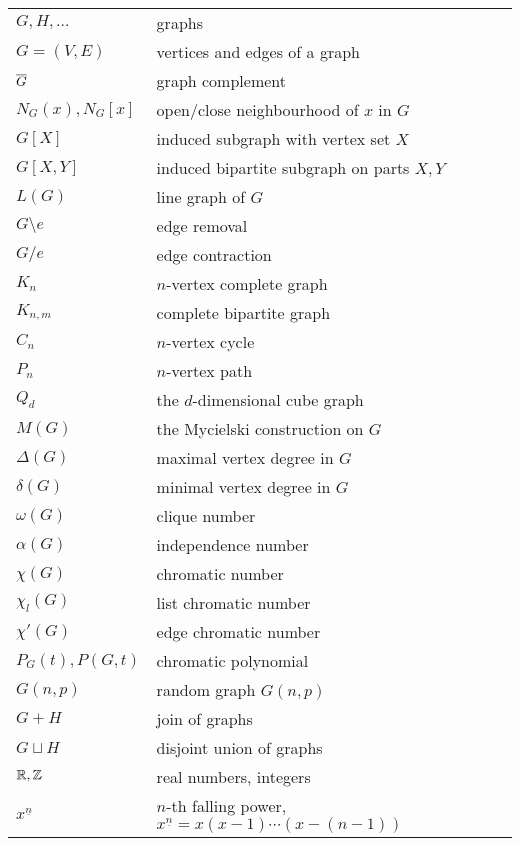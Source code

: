 \begin{center}
\begin{tabular}{ll}
$G, H, \ldots$          	&  graphs \\
$G=(V,E)$					&  vertices and edges of a graph \\
$\overline{G}$					&  graph complement \\
$N_G(x), N_G[x]$			&  open/close neighbourhood of $x$ in $G$ \\
$G[X]$						&  induced subgraph with vertex set $X$ \\
$G[X,Y]$					&  induced bipartite subgraph on parts $X,Y$ \\
$L(G)$						&  line graph of $G$ \\
$G\setminus e$				&  edge removal \\
$G/e$						&  edge contraction \\
$K_n$						&  $n$-vertex complete graph \\
$K_{n,m}$					&  complete bipartite graph \\
$C_n$						&  $n$-vertex cycle \\
$P_n$						&  $n$-vertex path \\
$Q_d$						&  the $d$-dimensional cube graph \\
$M(G)$						&  the Mycielski construction on $G$ \\
$\Delta(G)$					&  maximal vertex degree in $G$ \\
$\delta(G)$					&  minimal vertex degree in $G$ \\
$\omega(G)$					&  clique number \\
$\alpha(G)$					&  independence number \\
$\chi(G)$					&  chromatic number \\
$\chi_l(G)$					&  list chromatic number \\
$\chi'(G)$					&  edge chromatic number \\
$P_G(t), P(G,t)$			&  chromatic polynomial \\
$G(n,p)$					&  random graph $G(n,p)$ \\
$G+H$						&  join of graphs \\
$G\sqcup H$					&  disjoint union of graphs \\
$\mathbb{R}, \mathbb{Z}$				&  real numbers, integers \\
$x^{\underline{n}}$			&  $n$-th falling power, $x^{\underline{n}}=x(x-1)\cdots(x-(n-1))$
\end{tabular}
\end{center}